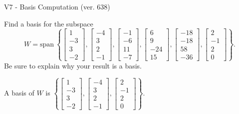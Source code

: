 \begin{exercise}
  \begin{exerciseTitle}V7 - Basis Computation (ver. 638)\end{exerciseTitle}
  \begin{exerciseStatement}
    Find a basis for the subspace 
\[W=\mathrm{span}\ \left\{\left[\begin{array}{r}
1 \\
-3 \\
3 \\
-2
\end{array}\right] , \left[\begin{array}{r}
-4 \\
3 \\
2 \\
-1
\end{array}\right] , \left[\begin{array}{r}
-1 \\
-6 \\
11 \\
-7
\end{array}\right] , \left[\begin{array}{r}
6 \\
9 \\
-24 \\
15
\end{array}\right] , \left[\begin{array}{r}
-18 \\
-18 \\
58 \\
-36
\end{array}\right] , \left[\begin{array}{r}
2 \\
-1 \\
2 \\
0
\end{array}\right]\right\}.\]
 Be sure to explain why your result is a basis.


  \end{exerciseStatement}
  \begin{exerciseAnswer}
   A basis of \(W\) is  \(\left\{\left[\begin{array}{r}
1 \\
-3 \\
3 \\
-2
\end{array}\right] , \left[\begin{array}{r}
-4 \\
3 \\
2 \\
-1
\end{array}\right] , \left[\begin{array}{r}
2 \\
-1 \\
2 \\
0
\end{array}\right]\right\}\).
  


  \end{exerciseAnswer}
\end{exercise}